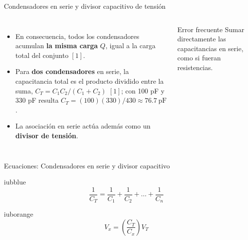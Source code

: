 \documentclass[aspectratio=169,11pt,xcolor={table}]{beamer}
\begin{document}
\begin{frame}{{\normalsize Condensadores en serie y divisor capacitivo de tensión}}
\begin{columns}[c,onlytextwidth]
\small
\begin{itemize}\setlength{\itemsep}{4pt}
  \item En consecuencia, todos los condensadores acumulan \textbf{la misma carga} $Q$, igual a la carga total del conjunto $[1]$.
  \item Para \textbf{dos condensadores} en serie, la capacitancia total es el producto dividido entre la suma, $C_T = C_1 C_2 / (C_1 + C_2)$ $[1]$; con 100 pF y 330 pF resulta $C_T = (100)(330)/430 \approx 76.7\ \text{pF}$.
  \item La asociación en serie actúa además como un \textbf{divisor de tensión}.
\end{itemize}
\begin{cardO}{Error frecuente}
\footnotesize Sumar directamente las capacitancias en serie, como si fueran resistencias.
\end{cardO}
\end{columns}
\end{frame}

\begin{frame}{{\normalsize Ecuaciones: Condensadores en serie y divisor capacitivo}}
\begin{cajaplana}{iubblue}
\centering
{\large
\begin{equation*}
  \frac{1}{C_T} = \frac{1}{C_1} + \frac{1}{C_2} + \dots + \frac{1}{C_n}
\end{equation*}
}
\end{cajaplana}
\vspace{1mm}
\begin{cajaplana}{iuborange}
\centering
{\large
\begin{equation*}
  V_x = \left( \frac{C_T}{C_x} \right) V_T
\end{equation*}
}
\end{cajaplana}
\end{frame}
\end{document}
